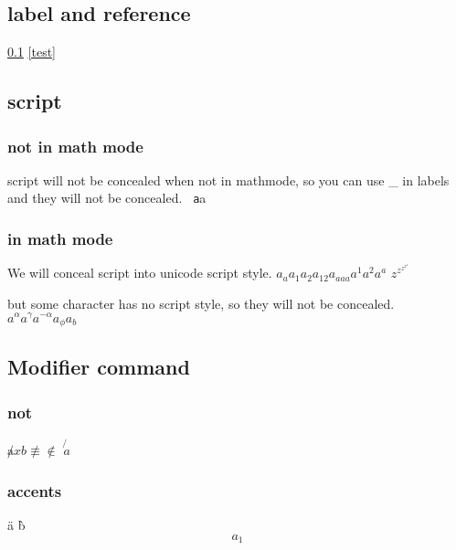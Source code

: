 \documentclass{ctexbook}
\begin{document}
\subsection{label and reference}
\label{test} \ref{test} \eqref{test} 

\subsection{script}
\subsubsection{not in math mode}
script will not be concealed when not in mathmode, so you can use \_ in labels and they will not be concealed.
\verb | a|a \alpha
\subsubsection{in math mode}
We will conceal script into unicode script style.
\(a_a a_1 a_2 a_{12} a_{aaa} a^1 a^2 a^a \)
\(z^{z^{z^{z^{z}}}}\)

but some character has no script style, so they will not be concealed.
\(a^\alpha a^\gamma a^{-\alpha} a_\phi a_b\)
\subsection{Modifier command}
\subsubsection{not}
\(\not ax b \not \equiv \not \in\)
\(\not{a}\)
\subsubsection{accents }
\"a \`b
\begin{equation}
  a_1
\end{equation}
\end{document}
